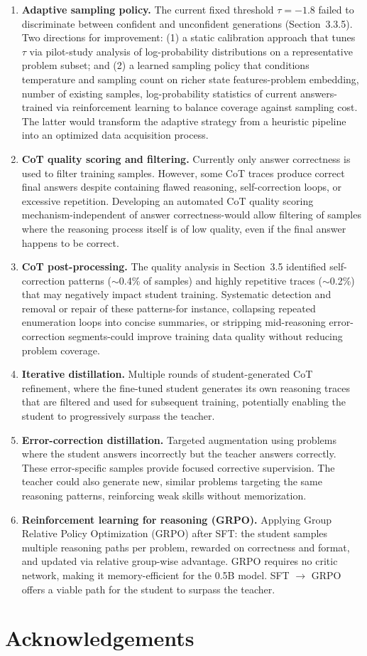 \documentclass{article}
\begin{document}
\begin{enumerate}[leftmargin=*]
    \item \textbf{Adaptive sampling policy.} The current fixed threshold $\tau = -1.8$ failed to discriminate between confident and unconfident generations (Section~3.3.5). Two directions for improvement: (1) a static calibration approach that tunes $\tau$ via pilot-study analysis of log-probability distributions on a representative problem subset; and (2) a learned sampling policy that conditions temperature and sampling count on richer state features-problem embedding, number of existing samples, log-probability statistics of current answers-trained via reinforcement learning to balance coverage against sampling cost. The latter would transform the adaptive strategy from a heuristic pipeline into an optimized data acquisition process.
    \item \textbf{CoT quality scoring and filtering.} Currently only answer correctness is used to filter training samples. However, some CoT traces produce correct final answers despite containing flawed reasoning, self-correction loops, or excessive repetition. Developing an automated CoT quality scoring mechanism-independent of answer correctness-would allow filtering of samples where the reasoning process itself is of low quality, even if the final answer happens to be correct.
    \item \textbf{CoT post-processing.} The quality analysis in Section~3.5 identified self-correction patterns ($\sim$0.4\% of samples) and highly repetitive traces ($\sim$0.2\%) that may negatively impact student training. Systematic detection and removal or repair of these patterns-for instance, collapsing repeated enumeration loops into concise summaries, or stripping mid-reasoning error-correction segments-could improve training data quality without reducing problem coverage.
    \item \textbf{Iterative distillation.} Multiple rounds of student-generated CoT refinement, where the fine-tuned student generates its own reasoning traces that are filtered and used for subsequent training, potentially enabling the student to progressively surpass the teacher.
    \item \textbf{Error-correction distillation.} Targeted augmentation using problems where the student answers incorrectly but the teacher answers correctly. These error-specific samples provide focused corrective supervision. The teacher could also generate new, similar problems targeting the same reasoning patterns, reinforcing weak skills without memorization.
    \item \textbf{Reinforcement learning for reasoning (GRPO).} Applying Group Relative Policy Optimization (GRPO) after SFT: the student samples multiple reasoning paths per problem, rewarded on correctness and format, and updated via relative group-wise advantage. GRPO requires no critic network, making it memory-efficient for the 0.5B model. SFT $\rightarrow$ GRPO offers a viable path for the student to surpass the teacher.
\end{enumerate}


\section*{Acknowledgements}

\medskip





\end{document}
